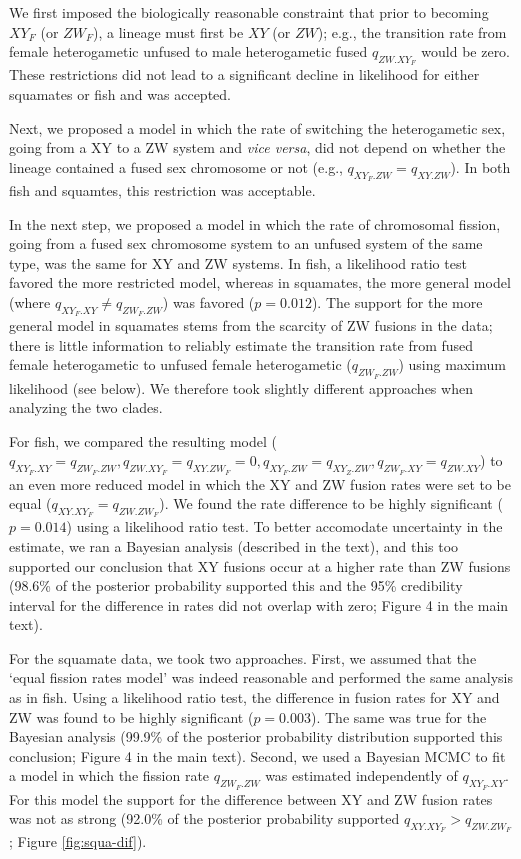\documentclass[12pt,twoside]{article}
\begin{document}
We first imposed the biologically reasonable constraint that prior to becoming $XY_F$ (or $ZW_F$), a lineage must first be $XY$ (or $ZW$); e.g., the transition rate from female heterogametic unfused to male heterogametic fused $q_{ZW.XY_F}$ would be zero. These restrictions did not lead to a significant decline in likelihood for either squamates or fish and was accepted.

Next, we proposed a model in which the rate of switching the heterogametic sex, going from a XY to a ZW system and \emph{vice versa}, did not depend on whether the lineage contained a fused sex chromosome or not (e.g., $q_{XY_F.ZW} = q_{XY.ZW}$). In both fish and squamtes, this restriction was acceptable.

In the next step, we proposed a model in which the rate of chromosomal fission, going from a fused sex chromosome system to an unfused system of the same type, was the same for XY and ZW systems. In fish, a likelihood ratio test favored the more restricted model, whereas in squamates, the more general model (where $q_{XY_F.XY} \neq q_{ZW_F.ZW}$) was favored ($p=\text{0.012}$). The support for the more general model in squamates stems from the scarcity of ZW fusions in the data; there is little information to reliably estimate the transition rate from fused female heterogametic to unfused female heterogametic ($q_{ZW_F.ZW}$) using maximum likelihood (see below). We therefore took slightly different approaches when analyzing the two clades.

For fish, we compared the resulting model ($q_{XY_F.XY} = q_{ZW_F.ZW}, q_{ZW.XY_F}=q_{XY.ZW_F}=\text{0}, q_{XY_F.ZW}=q_{XY_Z.ZW}, q_{ZW_F.XY}=q_{ZW.XY}$) to an even more reduced model in which the XY and ZW fusion rates were set to be equal ($q_{XY.XY_F}=q_{ZW.ZW_F}$). We found the rate difference to be highly significant ($p=\text{0.014}$) using a likelihood ratio test. To better accomodate uncertainty in the estimate, we ran a Bayesian analysis (described in the text), and this too supported our conclusion that XY fusions occur at a higher rate than ZW fusions (98.6\% of the posterior probability supported this and the 95\% credibility interval for the difference in rates did not overlap with zero; Figure 4 in the main text).

For the squamate data, we took two approaches. First, we assumed that the `equal fission rates model' was indeed reasonable and performed the same analysis as in fish. Using a likelihood ratio test, the difference in fusion rates for XY and ZW was found to be highly significant ($p=\text{0.003}$). The same was true for the Bayesian analysis (99.9\% of the posterior probability distribution supported this conclusion; Figure 4 in the main text). Second, we used a Bayesian MCMC to fit a model in which the fission rate $q_{ZW_F.ZW}$ was estimated independently of $q_{XY_F.XY}$. For this model the support for the difference between XY and ZW fusion rates was not as strong (92.0\% of the posterior probability supported $q_{XY.XY_F} > q_{ZW.ZW_F}$; Figure \ref{fig:squa-dif}).
\end{document}
